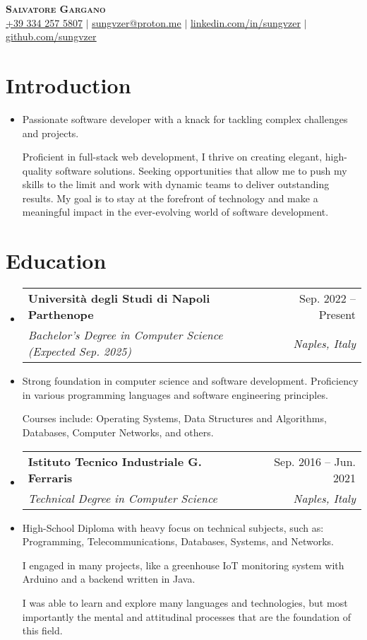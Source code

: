 \documentclass[letterpaper,11pt]{article}
\makeatletter
\newcommand{\resumeItem}[1]{
	\item\small{
		{#1 \vspace{-2pt}}
	}
}
\newcommand{\resumeSubheading}[4]{
	\vspace{-2pt}\item
	\begin{tabular*}{0.97\textwidth}[t]{l@{\extracolsep{\fill}}r}
		\textbf{#1} & #2 \\
		\textit{\small#3} & \textit{\small #4} \\
	\end{tabular*}\vspace{-7pt}
}
\newcommand{\resumeSubHeadingListStart}{\begin{itemize}[leftmargin=0.15in, label={}]}
\newcommand{\resumeSubHeadingListEnd}{\end{itemize}}
\makeatother
\begin{document}

\begin{center}
	\textbf{\Huge \scshape Salvatore Gargano} \\ \vspace{1pt}
	\href{tel:+393342575807}{\underline{+39 334 257 5807}} $|$ \href{mailto:sungvzer@proton.me}{\underline{sungvzer@proton.me}} $|$
	\href{https://linkedin.com/in/sungvzer}{\underline{linkedin.com/in/sungvzer}} $|$
	\href{https://github.com/sungvzer}{\underline{github.com/sungvzer}}
\end{center}


\section{Introduction}
\resumeSubHeadingListStart
\resumeItem{
	Passionate software developer with a knack for tackling complex challenges and projects.

	Proficient in full-stack web development, I thrive on creating elegant, high-quality software solutions. Seeking opportunities that allow me to push my skills to the limit and work with dynamic teams to deliver outstanding results. My goal is to stay at the forefront of technology and make a meaningful impact in the ever-evolving world of software development.
}
\resumeSubHeadingListEnd

\section{Education}
\resumeSubHeadingListStart
\resumeSubheading
{Università degli Studi di Napoli Parthenope}{Sep. 2022 -- Present}
{Bachelor's Degree in Computer Science (Expected Sep. 2025)}{Naples, Italy}
\resumeItem{
	Strong foundation in computer science and software development. Proficiency in various programming languages and software engineering principles.

	Courses include: Operating Systems, Data Structures and Algorithms, Databases, Computer Networks, and others.}
\resumeSubheading
{Istituto Tecnico Industriale G. Ferraris}{Sep. 2016 -- Jun. 2021}
{Technical Degree in Computer Science}{Naples, Italy}
\resumeItem{
	High-School Diploma with heavy focus on technical subjects, such as: Programming, Telecommunications, Databases, Systems, and Networks.

	I engaged in many projects, like a greenhouse IoT monitoring system with Arduino and a backend written in Java.

	I was able to learn and explore many languages and technologies, but most importantly the mental and attitudinal processes that are the foundation of this field.
}
\resumeSubHeadingListEnd
\end{document}
